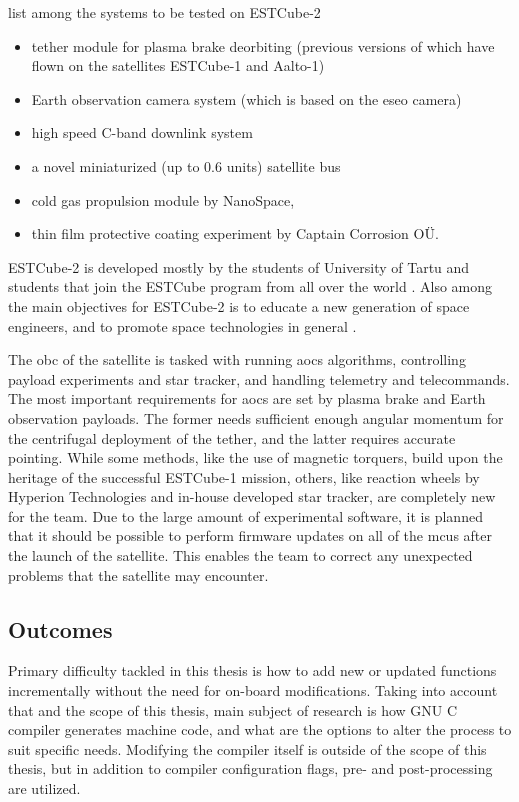 \textcite{Iakubivskyi2016} list among the systems to be tested on ESTCube-2
\begin{itemize}
  \item tether module for plasma brake deorbiting (previous versions of which have flown on the satellites ESTCube-1 and Aalto-1)
  \item Earth observation camera system (which is based on the \gls{eseo} camera)
  \item high speed C-band downlink system
  \item a novel miniaturized (up to 0.6 units) satellite bus
  \item cold gas propulsion module by NanoSpace,
  \item thin film protective coating experiment by Captain Corrosion OÜ.
\end{itemize}


ESTCube-2 is developed mostly by the students of University of Tartu and students that join the ESTCube program from all over the world \cite{Ehrpais2016}. Also among the main objectives for ESTCube-2 is to educate a new generation of space engineers, and to promote space technologies in general \cite{Iakubivskyi2016}.

The \gls{obc} of the satellite is tasked with running \gls{aocs} algorithms, controlling payload experiments and star tracker, and handling telemetry and telecommands. The most important requirements for \gls{aocs} are set by plasma brake and Earth observation payloads. The former needs sufficient enough angular momentum for the centrifugal deployment of the tether, and the latter requires accurate pointing. While some methods, like the use of magnetic torquers, build upon the heritage of the successful ESTCube-1 mission, others, like reaction wheels by Hyperion Technologies and in-house developed star tracker, are completely new for the team. Due to the large amount of experimental software, it is planned that it should be possible to perform firmware updates on all of the \glspl{mcu} after the launch of the satellite. This enables the team to correct any unexpected problems that the satellite may encounter. \cite{Ehrpais2016}


\subsection{Outcomes}

Primary difficulty tackled in this thesis is how to add new or updated functions incrementally without the need for on-board modifications. Taking into account that and the scope of this thesis, main subject of research is how GNU C compiler generates machine code, and what are the options to alter the process to suit specific needs. Modifying the compiler itself is outside of the scope of this thesis, but in addition to compiler configuration flags, pre- and post-processing are utilized.

